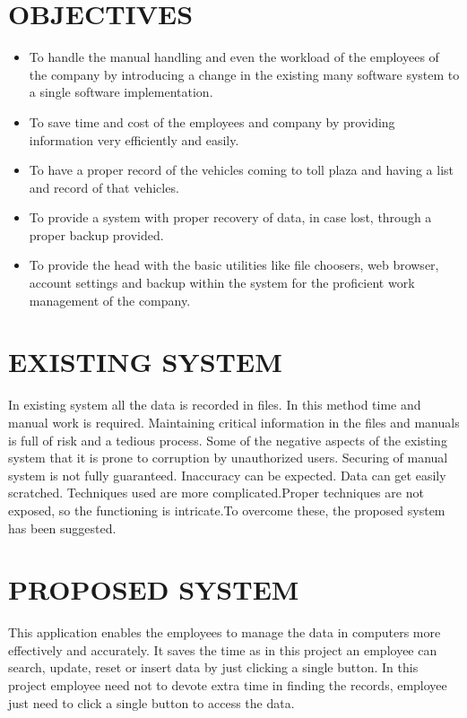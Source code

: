 \section{OBJECTIVES}
\begin{itemize}
\item To handle the manual handling and even the workload of the employees of the company by introducing a change in the existing many software system to a single software implementation.
\item To save time and cost of the employees and company by providing information very efficiently and easily.
\item To have a proper record of the vehicles coming to toll plaza and having a list and record of that vehicles.
\item To provide a system with proper recovery of data, in case lost, through a proper backup     provided.
\item To provide the head with the basic utilities like file choosers, web browser, account settings and backup within the system for the proficient work management of the company.
\end{itemize}

\section{EXISTING SYSTEM}
In existing system all the data is recorded in files. In this method time and manual work is required. Maintaining critical information in the files and manuals is full of risk and a tedious process.
Some of the negative aspects of the existing system that it is prone to corruption by unauthorized users. Securing of manual system is not fully guaranteed. Inaccuracy can be expected.
Data can get easily scratched. Techniques used are more complicated.Proper techniques are not
exposed, so the functioning is intricate.To overcome these, the proposed system has been suggested.

\section{PROPOSED SYSTEM}
This application enables the employees to manage the data in computers more effectively and accurately.
It saves the time as in this project an employee can search, update, reset or insert data by just clicking a single button.
In this project employee need not to devote extra time in finding the records, employee just need to click a single button to access the data.
